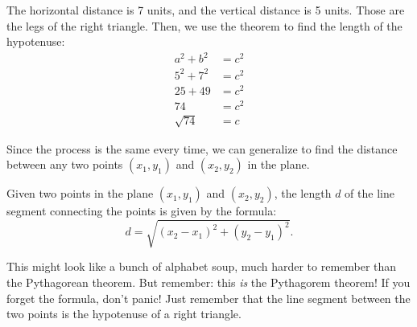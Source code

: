 The horizontal distance is 7 units, and the vertical distance is 5 units. Those are the legs of the right triangle. Then, we use the theorem to find the length of the hypotenuse: \[\begin{aligned} a^2 + b^2 &= c^2 \\ 5^2 + 7^2 &= c^2 \\ 25 + 49 &= c^2 \\ 74 &= c^2 \\ \sqrt{74} &= c\end{aligned}\]

Since the process is the same every time, we can generalize to find the distance between any two points $(x_1, y_1)$ and $(x_2, y_2)$ in the plane.

\begin{center}
\end{center}

\begin{boxeddef}
Given two points in the plane $(x_1, y_1)$ and $(x_2, y_2)$, the length $d$ of the line segment connecting the points is given by the formula:
\[d = \sqrt{ (x_2 - x_1)^2 + (y_2 - y_1)^2 }.\]
\end{boxeddef}

This might look like a bunch of alphabet soup, much harder to remember than the Pythagorean theorem. But remember: this \textit{is} the Pythagorem theorem! If you forget the formula, don't panic! Just remember that the line segment between the two points is the hypotenuse of a right triangle.

